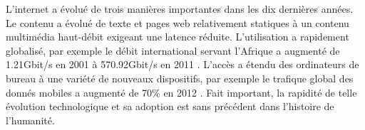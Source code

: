 
 


L'internet a évolué de trois manières importantes dans les dix dernières années. Le contenu a évolué de texte et pages web relativement statiques à un contenu multimédia haut-débit exigeant une latence réduite. L'utilisation a rapidement globalisé, par exemple le débit international servant l'Afrique a augmenté de 1.21Gbit/s en 2001 à 570.92Gbit/s en 2011 \cite{InternetGlobalGrowth}. L'accès a étendu des ordinateurs de bureau à une variété de nouveaux dispositifs, par exemple le trafique global des donnés mobiles a augmenté de 70\% en 2012 \cite{CiscoVNI2013}. Fait important, la rapidité de telle évolution technologique et sa adoption est sans précédent dans l'histoire de l'humanité. 


